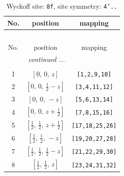 \documentclass[fleqn,8pt]{jsarticle}
\begin{document}
\begin{longtable}{ccc}
\caption{Wyckoff site: {\tt 8f}, site symmetry: {\tt 4'..}}
 \\
 \hline \hline
No. & position & mapping \\ \hline \endfirsthead

\multicolumn{2}{l}{\tablename\ \thetable{}} \\
 \hline \hline
No. & position & mapping \\ \hline \endhead

 \hline \hline
\multicolumn{2}{r}{\footnotesize\it continued ...} \\ \endfoot

 \hline \hline
\multicolumn{2}{r}{} \\ \endlastfoot

1 & $\left[ 0,\, 0,\, z \right]$ & {\tt [1,2,9,10]} \\ \hline
2 & $\left[ 0,\, 0,\, \frac{1}{2} - z \right]$ & {\tt [3,4,11,12]} \\ \hline
3 & $\left[ 0,\, 0,\, - z \right]$ & {\tt [5,6,13,14]} \\ \hline
4 & $\left[ 0,\, 0,\, z + \frac{1}{2} \right]$ & {\tt [7,8,15,16]} \\ \hline
5 & $\left[ \frac{1}{2},\, \frac{1}{2},\, z + \frac{1}{2} \right]$ & {\tt [17,18,25,26]} \\ \hline
6 & $\left[ \frac{1}{2},\, \frac{1}{2},\, - z \right]$ & {\tt [19,20,27,28]} \\ \hline
7 & $\left[ \frac{1}{2},\, \frac{1}{2},\, \frac{1}{2} - z \right]$ & {\tt [21,22,29,30]} \\ \hline
8 & $\left[ \frac{1}{2},\, \frac{1}{2},\, z \right]$ & {\tt [23,24,31,32]} \\
\end{longtable}
\renewcommand{\arraystretch}{1.2}
\end{document}
